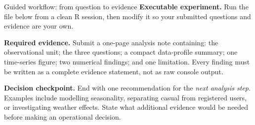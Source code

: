 \begin{labproject}{Guided workflow: from question to evidence}
\tcbbreak
\textbf{Executable experiment.} Run the file below from a clean R session, then modify it so your submitted questions and evidence are your own.

\begin{verification}
\textbf{Required evidence.} Submit a one-page analysis note containing: the observational unit; the three questions; a compact data-profile summary; one time-series figure; two numerical findings; and one limitation. Every finding must be written as a complete evidence statement, not as raw console output.

\textbf{Decision checkpoint.} End with one recommendation for the \emph{next analysis step}. Examples include modelling seasonality, separating casual from registered users, or investigating weather effects. State what additional evidence would be needed before making an operational decision.
\end{verification}
\end{labproject}
